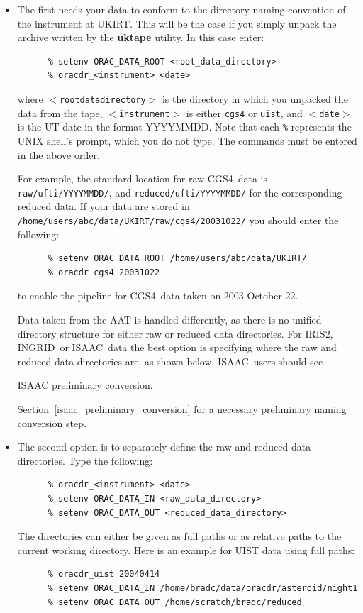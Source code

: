 \documentclass[twoside,11pt]{article}
\newcommand{\htmladdnormallink}[2]{#1}
\newcommand{\htmlref}[2]{#1}
\newenvironment{latexonly}{}{}
\renewcommand{\_}{\texttt{\symbol{95}}}
\newcommand{\INGRID}{\htmladdnormallink{INGRID}{http://www.ing.iac.es/Astronomy/instruments/ingrid/}}
\newcommand{\IRIS}{\htmladdnormallink{IRIS2}{http://www.aao.gov.au/iris2/}}
\newcommand{\ISAAC}{\htmladdnormallink{ISAAC}{http://www.eso.org/instruments/isaac/}}
\newcommand{\CGS}{\htmladdnormallink{CGS4}{http://www.jach.hawaii.edu/JACpublic/UKIRT/instruments/cgs4/cgs4.html}}
\begin{document}
\begin{itemize}

\item The first needs your data to conform to the directory-naming
convention of the instrument at UKIRT. This will be the case if you
simply unpack the archive written by the {\bf uktape} utility.
In this case enter:

\begin{verbatim}
      % setenv ORAC_DATA_ROOT <root_data_directory>
      % oracdr_<instrument> <date>
\end{verbatim}
where {\tt $<$root\_data\_directory$>$} is the directory in which you
unpacked the data from the tape, {\tt $<$instrument$>$} is either
{\tt cgs4} or {\tt uist}, and {\tt$<$date$>$} is the UT date in the
format YYYYMMDD. Note that each \texttt{\%} represents the UNIX shell's
prompt, which you do not type. The commands must be entered in the
above order.

For example, the standard location for raw \CGS\ data is {\tt
raw/ufti/YYYYMMDD/}, and {\tt reduced/ufti/YYYYMMDD/} for the
corresponding reduced data. If your data are stored in
{\tt /home/users/abc/data/UKIRT/raw/cgs4/20031022/} you should enter
the following:

\begin{verbatim}
      % setenv ORAC_DATA_ROOT /home/users/abc/data/UKIRT/
      % oracdr_cgs4 20031022
\end{verbatim}
to enable the pipeline for \CGS\ data taken on 2003 October 22.

Data taken from the AAT is handled differently, as there is no unified
directory structure for either raw or reduced data directories. For
\IRIS, \INGRID\ or \ISAAC\ data the best option is specifying where
the raw and reduced data directories are, as shown below. \ISAAC\
users should see
\begin{htmlonly}
\htmlref{ISAAC preliminary conversion.}{isaac_preliminary_conversion}
\end{htmlonly}
\begin{latexonly}
Section~\ref{isaac_preliminary_conversion}
\end{latexonly}
for a necessary preliminary naming conversion step.

\item The second option is to separately define the raw and reduced
data directories. Type the following:

\begin{verbatim}
      % oracdr_<instrument> <date>
      % setenv ORAC_DATA_IN <raw_data_directory>
      % setenv ORAC_DATA_OUT <reduced_data_directory>
\end{verbatim}

The directories can either be given as full paths or as relative
paths to the current working directory. Here is an example for UIST
data using full paths:
\begin{verbatim}
      % oracdr_uist 20040414
      % setenv ORAC_DATA_IN /home/bradc/data/oracdr/asteroid/night1
      % setenv ORAC_DATA_OUT /home/scratch/bradc/reduced
\end{verbatim}

\end{itemize}
\end{document}
